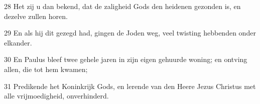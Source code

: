 \par 28 Het zij u dan bekend, dat de zaligheid Gods den heidenen gezonden is, en dezelve zullen horen.
\par 29 En als hij dit gezegd had, gingen de Joden weg, veel twisting hebbenden onder elkander.
\par 30 En Paulus bleef twee gehele jaren in zijn eigen gehuurde woning; en ontving allen, die tot hem kwamen;
\par 31 Predikende het Koninkrijk Gods, en lerende van den Heere Jezus Christus met alle vrijmoedigheid, onverhinderd.




